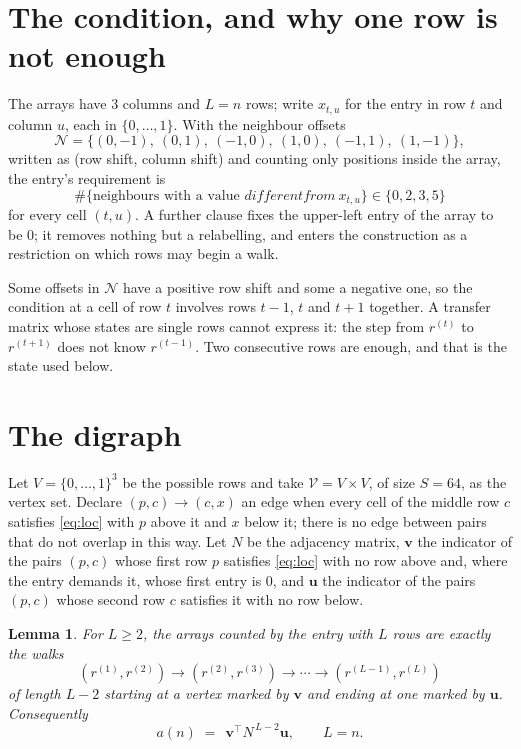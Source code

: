 \documentclass[11pt,a4paper]{article}
\theoremstyle{plain}
\newtheorem{lemma}[theorem]{Lemma}
\theoremstyle{definition}
\begin{document}
\section{The condition, and why one row is not enough}

The arrays have $3$ columns and $L=n$ rows; write $x_{t,u}$ for the entry in
row $t$ and column $u$, each in $\{0,\dots,1\}$. With the neighbour offsets
\[
\mathcal N=\{(0,-1),\ (0,1),\ (-1,0),\ (1,0),\ (-1,1),\ (1,-1)\},
\]
written as (row shift, column shift) and counting only positions inside the array, the
entry's requirement is
\begin{equation}\label{eq:loc}
\#\{\text{neighbours with a value }different from\ x_{t,u}\}\in\{0,2,3,5\}
\end{equation}
for every cell $(t,u)$. A further clause fixes the upper-left entry of the array to be $0$; it removes nothing but a relabelling, and enters the construction as a restriction on which rows may begin a walk.

Some offsets in $\mathcal N$ have a positive row shift and some a negative one, so the
condition at a cell of row $t$ involves rows $t-1$, $t$ and $t+1$ together. A transfer
matrix whose states are single rows cannot express it: the step from $r^{(t)}$ to
$r^{(t+1)}$ does not know $r^{(t-1)}$. Two consecutive rows are enough, and that is
the state used below.

\section{The digraph}

Let $V=\{0,\dots,1\}^{3}$ be the possible rows and take
$\mathcal V=V\times V$, of size $S=64$, as the vertex set. Declare $(p,c)\to(c,x)$ an edge
when every cell of the middle row $c$ satisfies \eqref{eq:loc} with $p$ above it and $x$
below it; there is no edge between pairs that do not overlap in this way. Let $N$ be the
adjacency matrix, $\mathbf{v}$ the indicator of the pairs $(p,c)$ whose first row $p$
satisfies \eqref{eq:loc} with no row above and, where the entry demands it, whose first entry is $0$, and $\mathbf{u}$ the indicator of
the pairs $(p,c)$ whose second row $c$ satisfies it with no row below.

\begin{lemma}\label{lem:walk}
For $L\ge2$, the arrays counted by the entry with $L$ rows are exactly the walks
\[
(r^{(1)},r^{(2)})\to(r^{(2)},r^{(3)})\to\cdots\to(r^{(L-1)},r^{(L)})
\]
of length $L-2$ starting at a vertex marked by $\mathbf{v}$ and ending at one marked by
$\mathbf{u}$. Consequently
\[
a(n)\;=\;\,\mathbf{v}^{\!\top}N^{\,L-2}\mathbf{u},\qquad L=n .
\]
\end{lemma}
\end{document}
